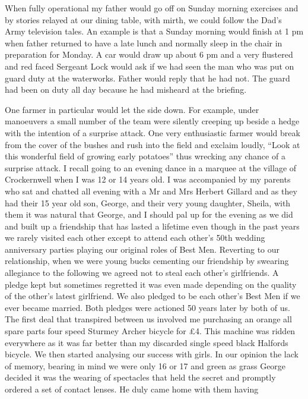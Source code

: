 When fully operational my father would go off on Sunday morning exercises and by
stories relayed at our dining table, with mirth, we could follow the Dad's Army
television tales.  An example is that a Sunday morning would finish at 1 pm
when father returned to have a late lunch and normally sleep in the chair in
preparation for Monday.  A car would draw up about 6 pm and a very flustered
and red faced Sergeant Lock would ask if we had seen the man who was put on
guard duty at the waterworks.  Father would reply that he had not.  The guard
had been on duty all day because he had misheard at the briefing.

One farmer in particular would let the side down.  For example, under manoeuvers
a small number of the team were silently creeping up beside a hedge with the
intention of a surprise attack.  One very enthusiastic farmer would break from
the cover of the bushes and rush into the field and exclaim loudly, ``Look at
this wonderful field of growing early potatoes'' thus wrecking any chance of a
surprise attack. I recall going to an evening dance in a marquee at the village
of Crockernwell when I was 12 or 14 years old.  I was accompanied by my parents
who sat and chatted all evening with a Mr and Mrs Herbert Gillard and as they
had their 15 year old son, George, and their very young daughter, Sheila, with
them it was natural that George, and I should pal up for the evening as we did
and built up a friendship that has lasted a lifetime even though in the past
years we rarely visited each other except to attend each other's 50th wedding
anniversary parties playing our original roles of Best Men.  Reverting to our
relationship, when we were young bucks cementing our friendship by swearing
allegiance to the following we agreed not to steal each other's girlfriends.  A
pledge kept but sometimes regretted it was even made depending on the quality
of the other's latest girlfriend.  We also pledged to be each other's Best Men
if we ever became married.   Both pledges were actioned 50 years later by both
of us. The first deal that transpired between us involved me purchasing an
orange all spare parts four speed Sturmey Archer bicycle for £4.  This machine
was ridden everywhere as it was far better than my discarded single speed black
Halfords bicycle. We then started analysing our success with girls.  In our
opinion the lack of memory, bearing in mind we were only 16 or 17 and green as
grass George decided it was the wearing of spectacles that held the secret and
promptly ordered a set of contact lenses.  He duly came home with them having
